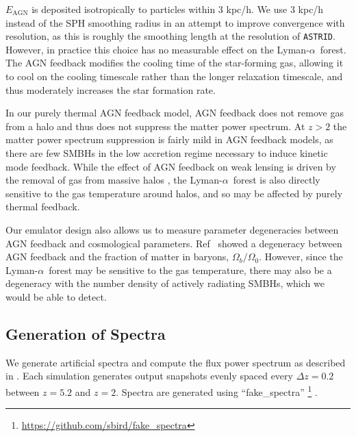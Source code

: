 \documentclass[a4paper,11pt]{article}
\newcommand{\Lya}{Lyman-$\alpha$}
\newcommand{\astrid}{\texttt{ASTRID}}
\begin{document}
$E_\mathrm{AGN}$ is deposited isotropically to particles within $3$ kpc/h. We use $3$ kpc/h instead of the SPH smoothing radius in an attempt to improve convergence with resolution, as this is roughly the smoothing length at the resolution of \astrid. However, in practice this choice has no measurable effect on the \Lya~forest. The AGN feedback modifies the cooling time of the star-forming gas, allowing it to cool on the cooling timescale rather than the longer relaxation timescale, and thus moderately increases the star formation rate.

In our purely thermal AGN feedback model, AGN feedback does not remove gas from a halo and thus does not suppress the matter power spectrum. At $z > 2$ the matter power spectrum suppression is fairly mild in AGN feedback models, as there are few SMBHs in the low accretion regime necessary to induce kinetic mode feedback. While the effect of AGN feedback on weak lensing is driven by the removal of gas from massive halos \cite[e.g.~][]{Giri:2021}, the \Lya~forest is also directly sensitive to the gas temperature around halos, and so may be affected by purely thermal feedback.

Our emulator design also allows us to measure parameter degeneracies between AGN feedback and cosmological parameters. Ref~\cite{Schneider:2015} showed a degeneracy between AGN feedback and the fraction of matter in baryons, $\Omega_b / \Omega_0$. However, since the \Lya~forest may be sensitive to the gas temperature, there may also be a degeneracy with the number density of actively radiating SMBHs, which we would be able to detect.


\subsection{Generation of Spectra}
\label{sec:spectra}

We generate artificial spectra and compute the flux power spectrum as described in \cite{Bird:2019}. Each simulation generates output snapshots evenly spaced every $\Delta z = 0.2$ between $z = 5.2$ and $z = 2$. Spectra are generated using ``fake\_spectra'' \footnote{\url{https://github.com/sbird/fake_spectra}} \cite{FSFE:2017}.
\end{document}
